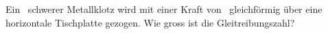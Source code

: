 Ein \mKlO\ schwerer Metallklotz wird mit einer Kraft von \FZuO\ gleichförmig über eine horizontale Tischplatte gezogen. Wie gross ist die Gleitreibungszahl?
